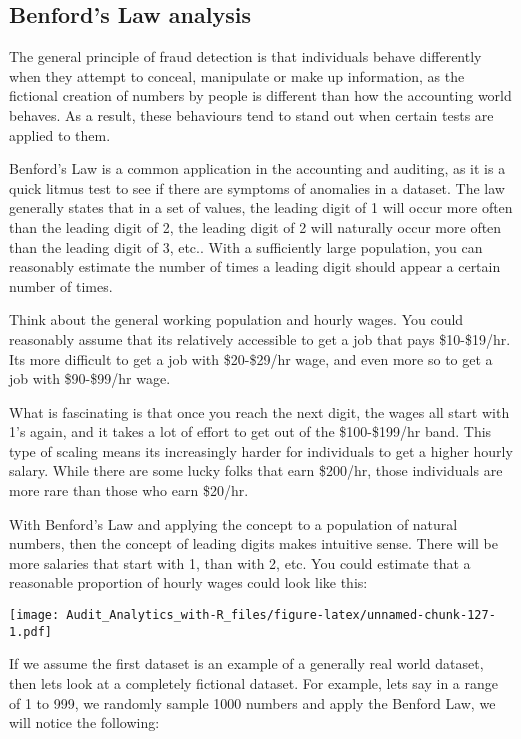 \documentclass[
]{book}
\begin{document}
\hypertarget{benfords-law-analysis}{%
\subsection{Benford's Law analysis}\label{benfords-law-analysis}}

The general principle of fraud detection is that individuals behave differently when they attempt to conceal, manipulate or make up information, as the fictional creation of numbers by people is different than how the accounting world behaves. As a result, these behaviours tend to stand out when certain tests are applied to them.

Benford's Law is a common application in the accounting and auditing, as it is a quick litmus test to see if there are symptoms of anomalies in a dataset. The law generally states that in a set of values, the leading digit of 1 will occur more often than the leading digit of 2, the leading digit of 2 will naturally occur more often than the leading digit of 3, etc.. With a sufficiently large population, you can reasonably estimate the number of times a leading digit should appear a certain number of times.

Think about the general working population and hourly wages. You could reasonably assume that its relatively accessible to get a job that pays \$10-\$19/hr. Its more difficult to get a job with \$20-\$29/hr wage, and even more so to get a job with \$90-\$99/hr wage.

What is fascinating is that once you reach the next digit, the wages all start with 1's again, and it takes a lot of effort to get out of the \$100-\$199/hr band. This type of scaling means its increasingly harder for individuals to get a higher hourly salary. While there are some lucky folks that earn \$200/hr, those individuals are more rare than those who earn \$20/hr.

With Benford's Law and applying the concept to a population of natural numbers, then the concept of leading digits makes intuitive sense. There will be more salaries that start with 1, than with 2, etc. You could estimate that a reasonable proportion of hourly wages could look like this:

\texttt{[image: Audit\_Analytics\_with-R\_files/figure-latex/unnamed-chunk-127-1.pdf]}

If we assume the first dataset is an example of a generally real world dataset, then lets look at a completely fictional dataset. For example, lets say in a range of 1 to 999, we randomly sample 1000 numbers and apply the Benford Law, we will notice the following:
\end{document}
